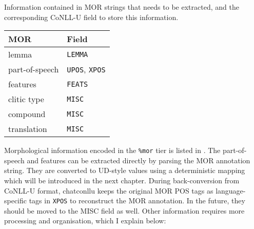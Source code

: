 \begin{margintable}[1\baselineskip]
\caption{\label{tab:martabmor}Information contained in MOR strings that needs to be extracted, and the corresponding CoNLL-U field to store this information.}
\begin{tabularx}{1\textwidth}{@{}ll@{}}
\toprule
\textbf{MOR} & \textbf{Field}\\\midrule
lemma & \texttt{LEMMA} \\
part-of-speech & \texttt{UPOS}, \texttt{XPOS}\\
features & \texttt{FEATS} \\\addlinespace
clitic type & \texttt{MISC} \\
compound & \texttt{MISC} \\
translation & \texttt{MISC} \\\bottomrule
\end{tabularx}
\end{margintable}

Morphological information encoded in the \texttt{\%mor} tier is listed in . The part-of-speech and features can be extracted directly by parsing the MOR annotation string. They are converted to UD-style values using a deterministic mapping which will be introduced in the next chapter.  During back-conversion from CoNLL-U format, chatconllu keeps the original MOR POS tags as language-specific tags in \texttt{XPOS} to reconstruct the MOR annotation. In the future, they should be moved to the MISC field as well. Other information requires more processing and organisation, which I explain below:

